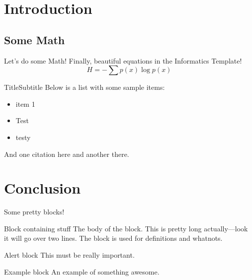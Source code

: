 \documentclass[aspectratio=169]{beamer}
\begin{document}
\section{Introduction}

\subsection{Some Math}

\begin{frame}{Let's do some Math!}
  Finally, beautiful equations in the Informatics Template!
  \begin{equation}
    H = -\sum p(x)\log p(x)
  \end{equation}
\end{frame}

\begin{frame}{Title}{Subtitle}
  Below is a list with some sample items:
  \begin{itemize}
    \item{item 1}
    \item{Test}
    \item{testy}
  \end{itemize}
  And one citation here and another there.
\end{frame}

\section{Conclusion}

\begin{frame}{Some pretty blocks!}
  \begin{block}{Block containing stuff}
    The body of the block. This is pretty long actually---look it will go over two lines. The block is used for definitions and whatnots.
  \end{block}
  \begin{alertblock}{Alert block}
    This must be really important.
  \end{alertblock}
  \begin{exampleblock}{Example block}
    An example of something awesome.
  \end{exampleblock}
\end{frame}

\begin{frame}
  \maketitle
\end{frame}
\end{document}
